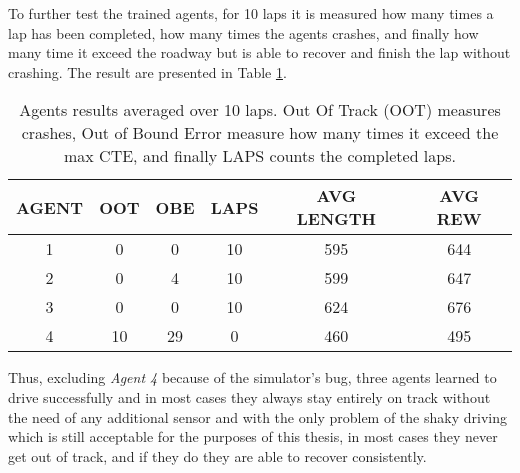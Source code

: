 To further test the trained agents, for 10 laps it is measured how many times a lap has been completed, how many times the agents crashes, and finally how many time it exceed the roadway but is able to recover and finish the lap without crashing. The result are presented in Table \ref{tab:simagent}.
\begin{table}
  \centering
  \begin{tabular}{|c|c|c|c|c|c|}
  \hline
  AGENT & OOT & OBE & LAPS & AVG LENGTH & AVG REW \\ \hline
  1 & 0 & 0 & 10 & 595 & 644 \\
  2 & 0 & 4 & 10 & 599 & 647  \\ \hline
  3 & 0 & 0 & 10 & 624 & 676 \\
  4 & 10 & 29 & 0 & 460 & 495  \\ \hline
  \end{tabular}
  \caption{Agents results averaged over 10 laps. Out Of Track (OOT) measures crashes, Out of Bound Error measure how many times it exceed the max CTE, and finally LAPS counts the completed laps.}
  \label{tab:simagent}
\end{table}
Thus, excluding\textit{ Agent 4 }because of the simulator's bug, three agents learned to drive successfully and in most cases they always stay entirely on track without the need of any additional sensor and with the only problem of the shaky driving which is still acceptable for the purposes of this thesis, in most cases they never get out of track, and if they do they are able to recover consistently.


